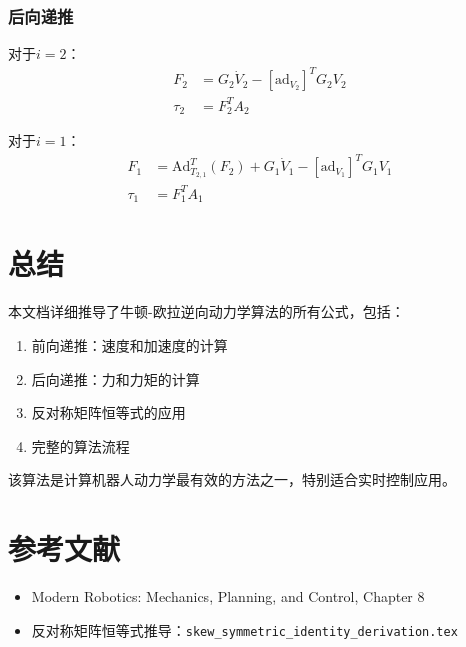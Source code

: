 \documentclass[12pt,a4paper]{article}
\begin{document}
    \subsubsection{后向递推}
    
    对于$i = 2$：
    \begin{align}
    F_2 &= G_2 \dot{V}_2 - [\text{ad}_{V_2}]^T G_2 V_2 \\
    \tau_2 &= F_2^T A_2
    \end{align}
    
    对于$i = 1$：
    \begin{align}
    F_1 &= \text{Ad}_{T_{2,1}}^T(F_2) + G_1 \dot{V}_1 - [\text{ad}_{V_1}]^T G_1 V_1 \\
    \tau_1 &= F_1^T A_1
    \end{align}
    
    \section{总结}
    
    本文档详细推导了牛顿-欧拉逆向动力学算法的所有公式，包括：
    \begin{enumerate}
    \item 前向递推：速度和加速度的计算
    \item 后向递推：力和力矩的计算
    \item 反对称矩阵恒等式的应用
    \item 完整的算法流程
    \end{enumerate}
    
    该算法是计算机器人动力学最有效的方法之一，特别适合实时控制应用。
    
    \section{参考文献}
    
    \begin{itemize}
    \item Modern Robotics: Mechanics, Planning, and Control, Chapter 8
    \item 反对称矩阵恒等式推导：\texttt{skew\_symmetric\_identity\_derivation.tex}
    \end{itemize}
    
\end{document}
